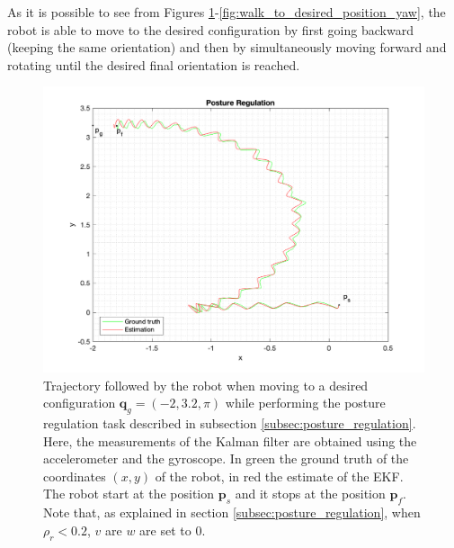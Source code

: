 \documentclass[a4paper]{article}
\begin{document}
As it is possible to see from Figures
\ref{fig:walk_to_desired_position}-\ref{fig:walk_to_desired_position_yaw},
the robot is able to move to the desired configuration by first going
backward (keeping the same orientation) and then by simultaneously moving forward
and rotating until the desired final orientation is reached.
\begin{figure}
    \centering
    \includegraphics[width=\textwidth]{images/posture_regulation.png}
    \caption{Trajectory followed by the robot when moving to a desired configuration
        $\bm{q}_g = (-2, 3.2, \pi)$ while performing the posture regulation task
        described in subsection \ref{subsec:posture_regulation}.
        Here, the measurements of the Kalman filter are obtained
        using the accelerometer and the gyroscope. In green the ground truth of the coordinates $(x, y)$ of the
        robot, in red the estimate of the EKF. The robot start at the
        position $\bm{p}_s$ and it stops at the position $\bm{p}_f$. Note that,
        as explained in section \ref{subsec:posture_regulation},
        when $\rho_r < 0.2$, $v$ are $w$ are set to 0.}
    \label{fig:walk_to_desired_position}
\end{figure}
\end{document}

